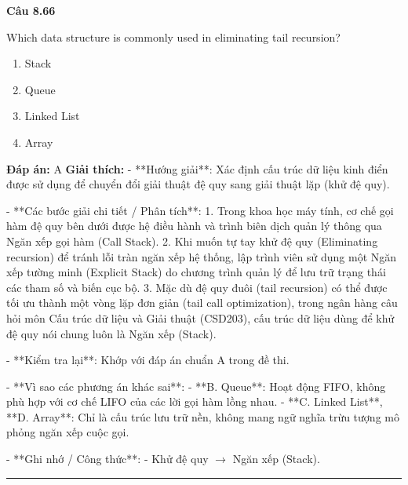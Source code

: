 \documentclass[11pt,a4paper]{article}
\newenvironment{question}[1]{%
  \par\vspace{1em}\noindent\textbf{\large Câu #1}\par\vspace{0.4em}
}{%
  \par\vspace{1em}\hrule\vspace{0.6em}
}
\newenvironment{choices}{%
  \begin{enumerate}[label=\textbf{\Alph*.},leftmargin=2.2em,itemsep=2pt,topsep=3pt]
}{%
  \end{enumerate}
}
\newcommand{\choice}{\item}
\begin{document}
\begin{question}{8.66}
Which data structure is commonly used in eliminating tail recursion?
\begin{choices}
\choice Stack
\choice Queue
\choice Linked List
\choice Array
\end{choices}
\textbf{Đáp án:} A
\textbf{Giải thích:} - **Hướng giải**:
  Xác định cấu trúc dữ liệu kinh điển được sử dụng để chuyển đổi giải thuật đệ quy sang giải thuật lặp (khử đệ quy).

- **Các bước giải chi tiết / Phân tích**:
  1. Trong khoa học máy tính, cơ chế gọi hàm đệ quy bên dưới được hệ điều hành và trình biên dịch quản lý thông qua Ngăn xếp gọi hàm (Call Stack).
  2. Khi muốn tự tay khử đệ quy (Eliminating recursion) để tránh lỗi tràn ngăn xếp hệ thống, lập trình viên sử dụng một Ngăn xếp tường minh (Explicit Stack) do chương trình quản lý để lưu trữ trạng thái các tham số và biến cục bộ.
  3. Mặc dù đệ quy đuôi (tail recursion) có thể được tối ưu thành một vòng lặp đơn giản (tail call optimization), trong ngân hàng câu hỏi môn Cấu trúc dữ liệu và Giải thuật (CSD203), cấu trúc dữ liệu dùng để khử đệ quy nói chung luôn là Ngăn xếp (Stack).

- **Kiểm tra lại**:
  Khớp với đáp án chuẩn A trong đề thi.

- **Vì sao các phương án khác sai**:
  - **B. Queue**: Hoạt động FIFO, không phù hợp với cơ chế LIFO của các lời gọi hàm lồng nhau.
  - **C. Linked List**, **D. Array**: Chỉ là cấu trúc lưu trữ nền, không mang ngữ nghĩa trừu tượng mô phỏng ngăn xếp cuộc gọi.

- **Ghi nhớ / Công thức**:
  - Khử đệ quy \(\rightarrow\) Ngăn xếp (Stack).
\end{question}
\end{document}
